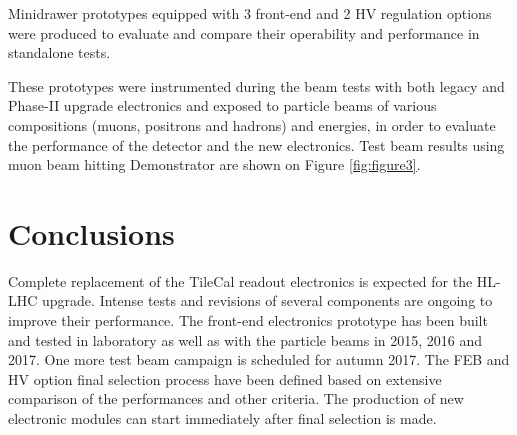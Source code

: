 \documentclass[10pt]{article}
\begin{document}
Minidrawer prototypes equipped with 3 front-end and 2 HV regulation options were produced to evaluate and compare their operability and performance in standalone tests. 

These prototypes were instrumented during the beam tests with both legacy and Phase-II upgrade electronics and 
exposed to particle beams of various compositions (muons, positrons and hadrons) and energies, in order to evaluate the performance of the detector and the new electronics. Test beam results using muon beam hitting Demonstrator are shown on Figure \ref{fig:figure3}.




\section{Conclusions}
Complete replacement of the TileCal readout electronics is expected for the HL-LHC upgrade. Intense tests and revisions of several components are ongoing to improve their performance.
The front-end electronics prototype has been built and tested in laboratory as well as with the
particle beams in 2015, 2016 and 2017. One more test beam campaign is scheduled for autumn 2017. The FEB and HV option final
selection process have been defined based on extensive comparison of the performances and other
criteria. The production of new electronic modules can start immediately after final selection is
made.


\end{document}
